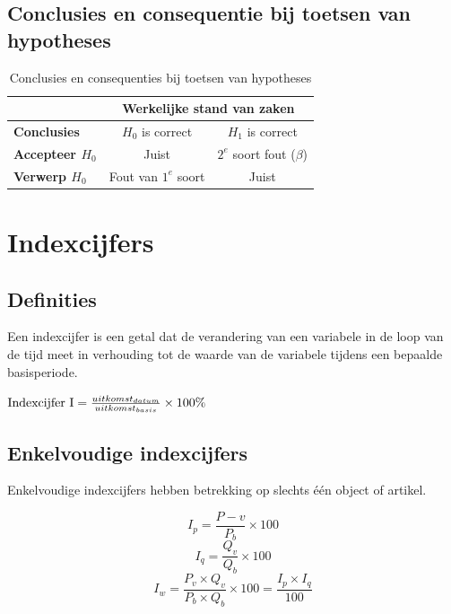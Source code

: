 \documentclass[a4paper,12pt]{article}
\begin{document}
\subsection{Conclusies en consequentie bij toetsen van hypotheses}
\begin{table}[H]
\centering
\begin{tabular}{l c c}

& \multicolumn{2}{c}{\textbf{Werkelijke stand van zaken}}\\
\hline
\textbf{Conclusies} & $H_0$ is correct & $H_1$ is correct \\
\textbf{Accepteer $H_0$} & Juist & $2^e$ soort fout ($\beta$)\\
\textbf{Verwerp $H_0$} & Fout van $1^e$ soort & Juist\\
\hline
\end{tabular}
\caption{Conclusies en consequenties bij toetsen van hypotheses}
\label{tab:conseqentiesToetsenHypotheses}
\end{table}

\section{Indexcijfers}
\subsection{Definities}
Een indexcijfer is een getal dat de verandering van een variabele in de loop van de tijd meet in verhouding tot de waarde van de variabele tijdens een bepaalde basisperiode.

$\textnormal{Indexcijfer I} = \frac{uitkomst_{datum}}{uitkomst_{basis}}\times 100\%$

\subsection{Enkelvoudige indexcijfers}
Enkelvoudige indexcijfers hebben betrekking op slechts één object of artikel.

\begin{equation}
I_p = \frac{P-v}{P_b}\times 100
\end{equation}
\begin{equation}
I_q = \frac{Q_v}{Q_b} \times 100
\end{equation}
\begin{equation}
I_w = \frac{P_v \times Q_v}{P_b \times Q_b} \times 100 = \frac{I_p \times I_q}{100}
\end{equation}
\end{document}
